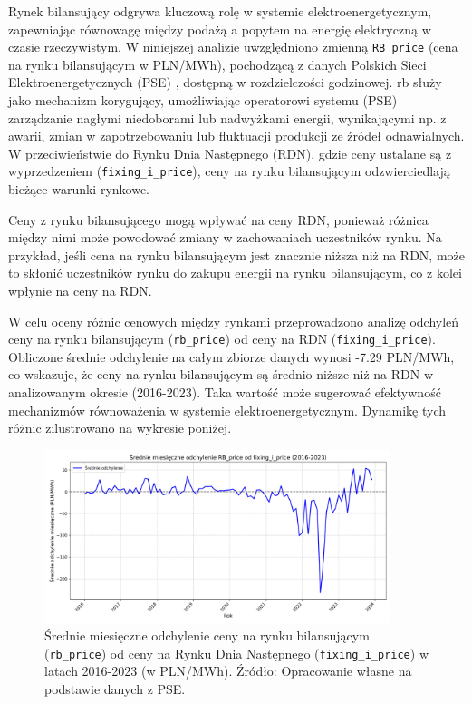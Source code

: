 Rynek bilansujący odgrywa kluczową rolę w systemie elektroenergetycznym, zapewniając równowagę między podażą a popytem na energię elektryczną w czasie rzeczywistym. W niniejszej analizie uwzględniono zmienną \texttt{RB\_price} (cena na rynku bilansującym w PLN/MWh), pochodzącą z danych Polskich Sieci Elektroenergetycznych (PSE) \cite{PSEOLD}, dostępną w rozdzielczości godzinowej. \gls{rb} służy jako mechanizm korygujący, umożliwiając operatorowi systemu (PSE) zarządzanie nagłymi niedoborami lub nadwyżkami energii, wynikającymi np. z awarii, zmian w zapotrzebowaniu lub fluktuacji produkcji ze źródeł odnawialnych. W przeciwieństwie do Rynku Dnia Następnego (RDN), gdzie ceny ustalane są z wyprzedzeniem (\texttt{fixing\_i\_price}), ceny na rynku bilansującym odzwierciedlają bieżące warunki rynkowe.

Ceny z rynku bilansującego mogą wpływać na ceny RDN, ponieważ różnica między nimi może powodować zmiany w zachowaniach uczestników rynku. Na przykład, jeśli cena na rynku bilansującym jest znacznie niższa niż na RDN, może to skłonić uczestników rynku do zakupu energii na rynku bilansującym, co z kolei wpłynie na ceny na RDN.

W celu oceny różnic cenowych między rynkami przeprowadzono analizę odchyleń ceny na rynku bilansującym (\texttt{rb\_price}) od ceny na RDN (\texttt{fixing\_i\_price}). Obliczone średnie odchylenie na całym zbiorze danych wynosi -7.29 PLN/MWh, co wskazuje, że ceny na rynku bilansującym są średnio niższe niż na RDN w analizowanym okresie (2016-2023). Taka wartość może sugerować efektywność mechanizmów równoważenia w systemie elektroenergetycznym. Dynamikę tych różnic zilustrowano na wykresie poniżej.

\begin{figure}[H]
    \centering
    \includegraphics[width=0.9\textwidth]{../plots/market/average_price_deviation.png}
    \caption{Średnie miesięczne odchylenie ceny na rynku bilansującym (\texttt{rb\_price}) od ceny na Rynku Dnia Następnego (\texttt{fixing\_i\_price}) w latach 2016-2023 (w PLN/MWh). Źródło: Opracowanie własne na podstawie danych z PSE.}
    \label{fig:price_deviation}
\end{figure}

